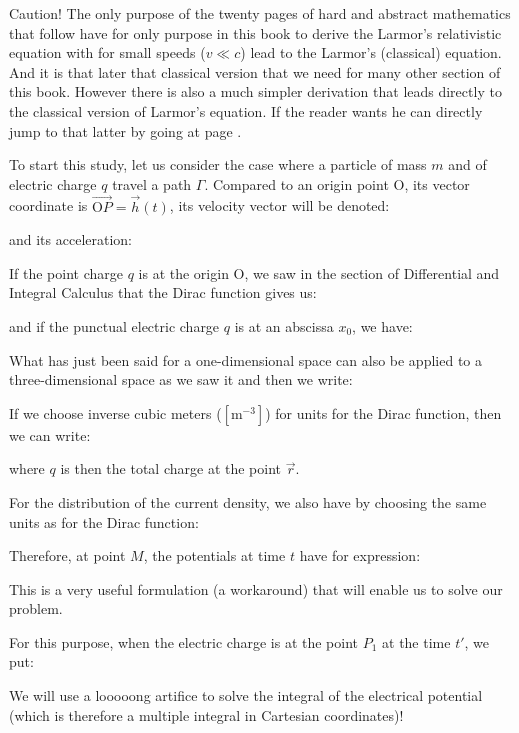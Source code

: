 	\begin{tcolorbox}[colback=red!5,borderline={1mm}{2mm}{red!5},arc=0mm,boxrule=0pt]
	\bcbombe Caution! The only purpose of the twenty pages of hard and abstract mathematics that follow have for only purpose in this book to derive the Larmor's relativistic equation with for small speeds ($v\ll c$) lead to the Larmor's (classical) equation. And it is that later that classical version that we need for many other section of this book. However there is also a much simpler derivation that leads directly to the classical version of Larmor's equation. If the reader wants he can directly jump to that latter by going at page \pageref{Larmor equation classical derivation}. 
	\end{tcolorbox}
	
	To start this study, let us consider the case where a particle of mass $m$ and of electric charge $q$ travel a path $\Gamma$. Compared to an origin point O, its vector coordinate is $\overrightarrow{\text{O}P}=\vec{h}(t)$, its velocity vector will be denoted:
	
	and its acceleration:
	
	If the point charge $q$ is at the origin O, we saw in the section of Differential and Integral Calculus that the Dirac function gives us:
	
	and if the punctual electric charge $q$ is at an abscissa $x_0$, we have:
	
	What has just been said for a one-dimensional space can also be applied to a three-dimensional space as we saw it and then we write:
	
	If we choose inverse cubic meters ($[\text{m}^{-3}]$) for units for the Dirac function, then we can write:
	
	where $q$ is then the total charge at the point $\vec{r}$.

	For the distribution of the current density, we also have by choosing the same units as for the Dirac function:
	
	Therefore, at point $M$, the potentials at time $t$ have for expression:
	
	This is a very useful formulation (a workaround) that will enable us to solve our problem.

	For this purpose, when the electric charge is at the point $P_1$ at the time $t'$, we put:
	
	We will use a looooong artifice to solve the integral of the electrical potential (which is therefore a multiple integral in Cartesian coordinates)!

